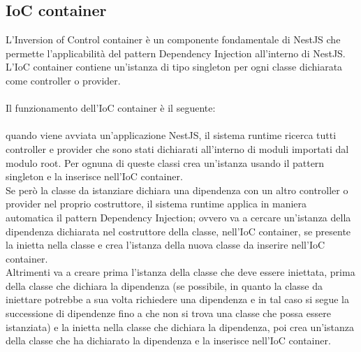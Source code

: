 \subsection{IoC container}
L'Inversion of Control container è un componente fondamentale di NestJS che permette l'applicabilità
del pattern Dependency Injection all'interno di NestJS.
\\
L'IoC container contiene un'istanza di tipo singleton per ogni classe dichiarata come controller o provider.
\\\\
Il funzionamento dell'IoC container è il seguente:
\\\\
quando viene avviata un'applicazione NestJS, il sistema runtime ricerca tutti controller e provider che 
sono stati dichiarati all'interno di moduli importati dal modulo root. Per ognuna di queste classi crea un'istanza
usando il pattern singleton e la inserisce nell'IoC container. 
\\
Se però la classe da istanziare dichiara una dipendenza con un altro controller o provider nel proprio 
costruttore, il sistema runtime applica in maniera automatica il pattern Dependency Injection; ovvero
va a cercare un'istanza della dipendenza dichiarata nel costruttore della classe, nell'IoC container, se
presente la inietta nella classe e crea l'istanza della nuova classe da inserire nell'IoC container. 
\\
Altrimenti va a creare prima
l'istanza della classe che deve essere iniettata, prima della classe che dichiara la dipendenza (se possibile, in quanto la
classe da iniettare potrebbe a sua volta richiedere una dipendenza e in tal caso si segue la successione di 
dipendenze fino a che non si trova una classe che possa essere istanziata) e la inietta nella classe che dichiara
la dipendenza, poi crea un'istanza della classe che ha dichiarato la dipendenza e la inserisce nell'IoC container.

